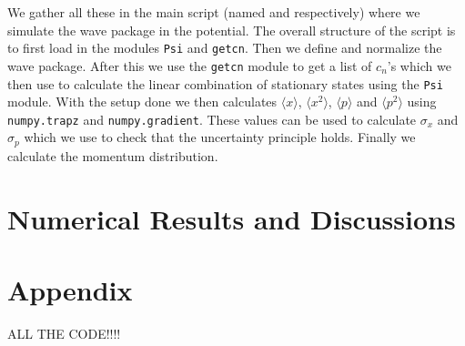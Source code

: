 \documentclass[12pt,a4paper]{article}
\begin{document}
We gather all these in the main script (named  and  respectively) where we simulate the wave package in the potential.	The overall structure of the script is to first load in the modules \verb!Psi! and \verb!getcn!. Then we define and normalize the wave package. After this we use the \verb!getcn! module to get a list of $c_n$'s which we then use to calculate the linear combination of stationary states using the \verb!Psi! module. With the setup done we then calculates $\langle x \rangle$, $\langle x^2 \rangle$, $\langle p \rangle$ and $\langle p^2 \rangle$ using \lstinline{numpy.trapz} and \lstinline{numpy.gradient}. These values can be used to calculate $\sigma_x$ and $\sigma_p$ which we use to check that the uncertainty principle holds. Finally we calculate the momentum distribution.

\section{Numerical Results and Discussions}

\section{Appendix}
ALL THE CODE!!!!
\end{document}
